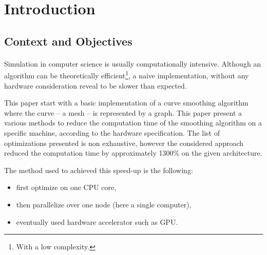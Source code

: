 \documentclass[fleqn,11pt]{SelfArx} %
\affiliation{\textsuperscript{1}RB812 \hfill \textsuperscript{2}AC5612 \hfill \textsuperscript{3}GF210}
\begin{document}



\flushbottom %

\maketitle %

\tableofcontents %

\thispagestyle{empty} %


\section{Introduction}
\subsection{Context and Objectives}
\paragraph{}
Simulation in computer science is usually computationally intensive. Although an algorithm can be theoretically efficient\footnote{With a low complexity.}, a naive implementation, without any hardware consideration reveal to be slower than expected.

This paper start with a basic implementation of a curve smoothing algorithm where the curve -- a mesh -- is represented by a graph. This paper present a various methods to reduce the computation time of the smoothing algorithm on a specific machine, according to the hardware specification. The list of optimizations presented is non exhaustive, however the considered approach reduced the computation time by approximately 1300\% on the given architecture.

The method used to achieved this speed-up is the following:
\begin{itemize}  \vspace{-4mm}
\item first optimize on one CPU core, \vspace{-4mm}
\item then parallelize over one node (here a single computer), \vspace{-4mm}
\item eventually used hardware accelerator such as GPU.
\end{itemize}
\end{document}
